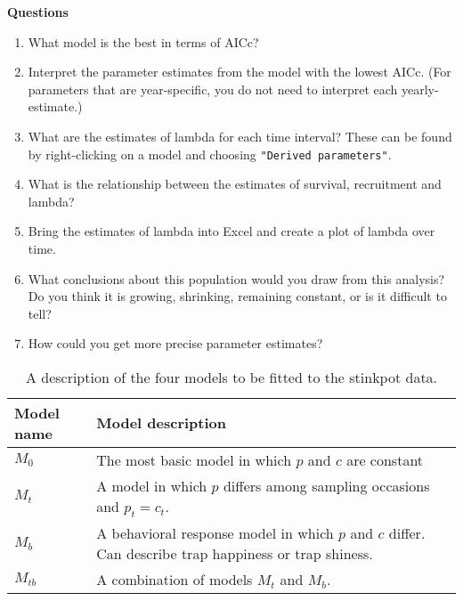 \documentclass[12pt]{article}
\begin{document}

{\bf Questions}

\begin{enumerate}
  \item What model is the best in terms of AICc?
  \item Interpret the parameter estimates from the model with the
    lowest AICc. (For parameters that are year-specific, you do not
    need to interpret each yearly-estimate.)
  \item What are the estimates of lambda for each time interval? These
    can be found by right-clicking on a model and choosing
    \verb+"Derived parameters"+.
  \item What is the relationship between the estimates of survival,
    recruitment and lambda?
  \item Bring the estimates of lambda into Excel and create a plot of
    lambda over time.
  \item What conclusions about this population would you draw from
    this analysis? Do you think it is growing, shrinking, remaining
    constant, or is it difficult to tell?
  \item How could you get more precise parameter estimates?
\end{enumerate}

\begin{table}[h!]
  \centering
  \caption{A description of the four models to be fitted to the
    stinkpot data.}
  \footnotesize
  \begin{tabular}[h!]{ll}
    \hline
    Model name & Model description \\
    \hline
    $M_0$ & The most basic model in which $p$ and $c$ are constant \\
    $M_t$ & A model in which $p$ differs among sampling occasions and
            $p_t=c_t$. \\
    $M_b$ & A behavioral response model in which $p$ and $c$
            differ. Can describe trap happiness or trap shiness. \\
    $M_{tb}$ & A combination of models $M_t$ and $M_b$. \\
    \hline
  \end{tabular}
  \label{tab:Otis}
\end{table}
\end{document}

